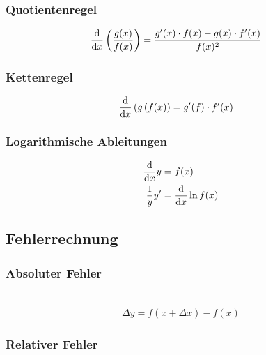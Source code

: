 \subsubsection*{Quotientenregel}
 \begin{align*} 
\frac{\mathop{}\!\mathrm{d} }{\mathop{}\!\mathrm{d} x}\left(\frac{g(x)}{f(x)}\right)&=\frac{g'(x)\cdot f(x)-g(x)\cdot f'(x)}{f(x)^2}
 \end{align*}

\begin{multicols}{2}
\subsubsection*{Kettenregel}
 \begin{align*} 
\frac{\mathop{}\!\mathrm{d} }{\mathop{}\!\mathrm{d} x}\left(g\left( f(x\right)\right)&=g'(f)\cdot f'(x)
 \end{align*}
\vfill            
\subsubsection*{Logarithmische Ableitungen}
 \begin{align*} 
\frac{\mathop{}\!\mathrm{d} }{\mathop{}\!\mathrm{d} x}y&=f(x)\\
\frac{1}{y}y'&=\frac{\mathop{}\!\mathrm{d} }{\mathop{}\!\mathrm{d} x}\ln{f(x)}
 \end{align*}
\vfill
\end{multicols}
          
\subsection{Fehlerrechnung}

\subsubsection*{Absoluter Fehler}
\\
\begin{align*} 
\Delta y=f(x+\Delta x)-f(x)
\end{align*}
         
\newpage
\subsubsection*{Relativer Fehler}
\\

